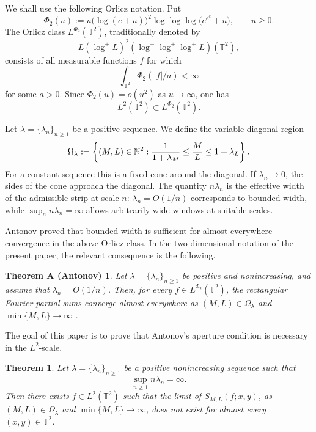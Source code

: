 \documentclass[11pt]{amsart}
\numberwithin{equation}{section}
\newtheorem{theorem}{Theorem}[section]
\newtheorem*{antonovthm}{Theorem A (Antonov)}
\begin{document}
We shall use the following Orlicz notation. Put 
\begin{equation*}
\Phi_{2}(u):=u\bigl(\log(e+u)\bigr)^2  \log\log\log\bigl(e^{e^e}+u\bigr)%
,\qquad u\ge0. 
\end{equation*}
The Orlicz class $L^{\Phi_{2}}(\mathbb{T}^2)$, traditionally denoted by 
\begin{equation*}
L(\log^+L)^2(\log^+\log^+\log^+L)(\mathbb{T}^2), 
\end{equation*}
consists of all measurable functions $f$ for which 
\begin{equation*}
\int_{\mathbb{T}^2}\Phi_{2}(|f|/a)<\infty 
\end{equation*}
for some $a>0$. Since $\Phi_{2}(u)=o(u^2)$ as $u\to\infty$, one has 
\begin{equation*}
L^2(\mathbb{T}^2)\subset L^{\Phi_{2}}(\mathbb{T}^2). 
\end{equation*}

Let $\lambda=\{\lambda_n\}_{n\ge1}$ be a positive sequence. We define the
variable diagonal region 
\begin{equation}  \label{eq:omega-lambda}
\Omega_\lambda:= \left\{(M,L)\in\mathbb{N}^2: \frac{1}{1+\lambda_M}\le \frac{%
M}{L}\le 1+\lambda_L \right\}.
\end{equation}
For a constant sequence this is a fixed cone around the diagonal. If $%
\lambda_n\to0$, the sides of the cone approach the diagonal. The quantity $%
n\lambda_n$ is the effective width of the admissible strip at scale $n$: $%
\lambda_n=O(1/n)$ corresponds to bounded width, while $\sup_n
n\lambda_n=\infty$ allows arbitrarily wide windows at suitable scales.

Antonov proved that bounded width is sufficient for almost everywhere
convergence in the above Orlicz class. In the two-dimensional notation of
the present paper, the relevant consequence is the following.

\begin{antonovthm}
Let $\lambda=\{\lambda_n\}_{n\ge1}$ be positive and nonincreasing, and
assume that $\lambda_n=O(1/n)$. Then, for every $f\in L^{\Phi_{2}}(\mathbb{T}%
^2)$, the rectangular Fourier partial sums converge almost everywhere as $%
(M,L)\in\Omega_\lambda$ and $\min\{M,L\}\to\infty$ \cite[Theorem~2]%
{Antonov2017}.
\end{antonovthm}

The goal of this paper is to prove that Antonov's aperture condition is
necessary in the $L^2$-scale.

\begin{theorem}
\label{thm:main} Let $\lambda=\{\lambda_n\}_{n\ge1}$ be a positive
nonincreasing sequence such that 
\begin{equation*}
\sup_{n\ge1} n\lambda_n=\infty . 
\end{equation*}
Then there exists $f\in L^2(\mathbb{T}^2)$ such that the limit of $%
S_{M,L}(f;x,y)$, as $(M,L)\in\Omega_\lambda$ and $\min\{M,L\}\to\infty$,
does not exist for almost every $(x,y)\in\mathbb{T}^2$.
\end{theorem}
\end{document}
